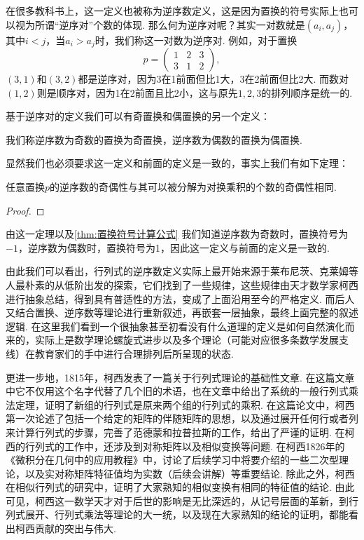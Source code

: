 在很多教科书上，这一定义也被称为逆序数定义，这是因为置换的符号实际上也可以视为所谓``逆序对''个数的体现. 那么何为逆序对呢？其实一对数就是$(a_i,a_j)$，其中$i<j$，当$a_i>a_j$时，我们称这一对数为逆序对. 例如，对于置换
\[p=\begin{pmatrix}
        1 & 2 & 3 \\
        3 & 1 & 2
    \end{pmatrix},\]
$(3,1)$和$(3,2)$都是逆序对，因为3在1前面但比1大，3在2前面但比2大. 而数对$(1,2)$则是顺序对，因为1在2前面且比2小，这与原先$1,2,3$的排列顺序是统一的.

基于逆序对的定义我们可以有奇置换和偶置换的另一个定义：
\begin{definition}{}{}
    我们称逆序数为奇数的置换为奇置换，逆序数为偶数的置换为偶置换.
\end{definition}

显然我们也必须要求这一定义和前面的定义是一致的，事实上我们有如下定理：
\begin{theorem}{}{}
    任意置换$p$的逆序数的奇偶性与其可以被分解为对换乘积的个数的奇偶性相同.
\end{theorem}

\begin{proof}

\end{proof}

由这一定理以及\autoref{thm:置换符号计算公式} 我们知道逆序数为奇数时，置换符号为$-1$，逆序数为偶数时，置换符号为1，因此这一定义与前面的定义是一致的.

由此我们可以看出，行列式的逆序数定义实际上最开始来源于莱布尼茨、克莱姆等人最朴素的从低阶出发的探索，它们找到了一些规律，这些规律由天才数学家柯西进行抽象总结，得到具有普适性的方法，变成了上面沿用至今的严格定义. 而后人又结合置换、逆序数等理论进行重新叙述，再嵌套一层抽象，最终上面完整的叙述逻辑. 在这里我们看到一个很抽象甚至初看没有什么道理的定义是如何自然演化而来的，实际上是数学理论螺旋式进步以及多个理论（可能对应很多条数学发展支线）在教育家们的手中进行合理排列后所呈现的状态.

更进一步地，1815年，柯西发表了一篇关于行列式理论的基础性文章. 在这篇文章中它不仅用这个名字代替了几个旧的术语，也在文章中给出了系统的一般行列式乘法定理，证明了新组的行列式是原来两个组的行列式的乘积. 在这篇论文中，柯西第一次论述了包括一个给定的矩阵的伴随矩阵的思想，以及通过展开任何行或者列来计算行列式的步骤，完善了范德蒙和拉普拉斯的工作，给出了严谨的证明. 在柯西的行列式的工作中，还涉及到对称矩阵以及相似变换等问题. 在柯西1826年的《微积分在几何中的应用教程》中，讨论了后续学习中将要介绍的一些二次型理论，以及实对称矩阵特征值均为实数（后续会讲解）等重要结论. 除此之外，柯西在相似行列式的研究中，证明了大家熟知的相似变换有相同的特征值的结论. 由此可见，柯西这一数学天才对于后世的影响是无比深远的，从记号层面的革新，到行列式展开、行列式乘法等理论的大一统，以及现在大家熟知的结论的证明，都能看出柯西贡献的突出与伟大.

